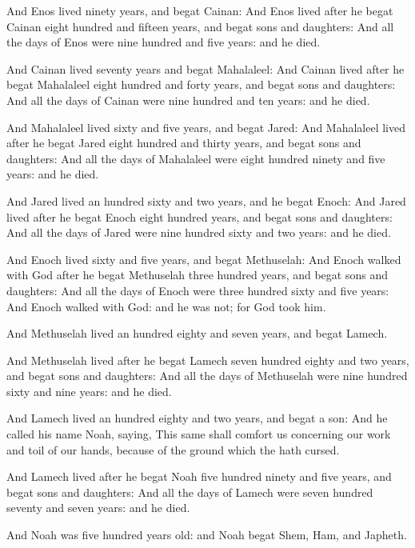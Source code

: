 \verse And Enos lived ninety years, and begat Cainan: \verse And Enos lived after he begat Cainan eight hundred and fifteen years, and begat sons and daughters: \verse And all the days of Enos were nine hundred and five years: and he died.

\verse And Cainan lived seventy years and begat Mahalaleel: \verse And Cainan lived after he begat Mahalaleel eight hundred and forty years, and begat sons and daughters: \verse And all the days of Cainan were nine hundred and ten years: and he died.

\verse And Mahalaleel lived sixty and five years, and begat Jared: \verse And Mahalaleel lived after he begat Jared eight hundred and thirty years, and begat sons and daughters: \verse And all the days of Mahalaleel were eight hundred ninety and five years: and he died.

\verse And Jared lived an hundred sixty and two years, and he begat Enoch: \verse And Jared lived after he begat Enoch eight hundred years, and begat sons and daughters: \verse And all the days of Jared were nine hundred sixty and two years: and he died.

\verse And Enoch lived sixty and five years, and begat Methuselah: \verse And Enoch walked with God after he begat Methuselah three hundred years, and begat sons and daughters: \verse And all the days of Enoch were three hundred sixty and five years: \verse And Enoch walked with God: and he was not; for God took him.

\verse And Methuselah lived an hundred eighty and seven years, and begat Lamech.

\verse And Methuselah lived after he begat Lamech seven hundred eighty and two years, and begat sons and daughters: \verse And all the days of Methuselah were nine hundred sixty and nine years: and he died.

\verse And Lamech lived an hundred eighty and two years, and begat a son: \verse And he called his name Noah, saying, This same shall comfort us concerning our work and toil of our hands, because of the ground which the \LORD hath cursed.

\verse And Lamech lived after he begat Noah five hundred ninety and five years, and begat sons and daughters: \verse And all the days of Lamech were seven hundred seventy and seven years: and he died.

\verse And Noah was five hundred years old: and Noah begat Shem, Ham, and Japheth.

